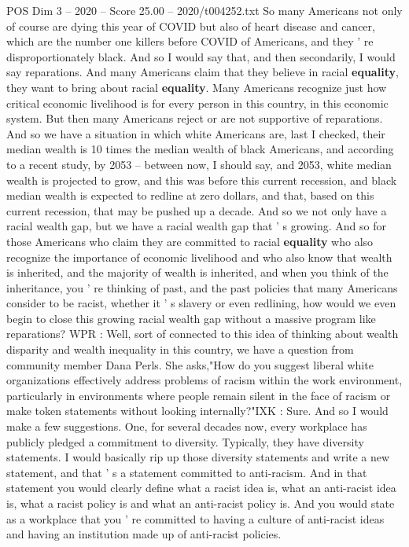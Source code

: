 \begin{textsample}{POS Dim 3 – 2020 – Score 25.00 – 2020/t004252.txt}
So many Americans not only of course are dying this year of COVID but also of heart disease and cancer, which are the number one killers before COVID of Americans, and they ' re disproportionately black.
And so I would say that, and then secondarily, I would say reparations.
And many Americans claim that they believe in racial \textbf{equality}, they want to bring about racial \textbf{equality}.
Many Americans recognize just how critical economic livelihood is for every person in this country, in this economic system.
But then many Americans reject or are not supportive of reparations.
And so we have a situation in which white Americans are, last I checked, their median wealth is 10 times the median wealth of black Americans, and according to a recent study, by 2053 -- between now, I should say, and 2053, white median wealth is projected to grow, and this was before this current recession, and black median wealth is expected to redline at zero dollars, and that, based on this current recession, that may be pushed up a decade.
And so we not only have a racial wealth gap, but we have a racial wealth gap that ' s growing.
And so for those Americans who claim they are committed to racial \textbf{equality} who also recognize the importance of economic livelihood and who also know that wealth is inherited, and the majority of wealth is inherited, and when you think of the inheritance, you ' re thinking of past, and the past policies that many Americans consider to be racist, whether it ' s slavery or even redlining, how would we even begin to close this growing racial wealth gap without a massive program like reparations?
WPR : Well, sort of connected to this idea of thinking about wealth disparity and wealth inequality in this country, we have a question from community member Dana Perls.
She asks,"How do you suggest liberal white organizations effectively address problems of racism within the work environment, particularly in environments where people remain silent in the face of racism or make token statements without looking internally?"IXK : Sure.
And so I would make a few suggestions.
One, for several decades now, every workplace has publicly pledged a commitment to diversity.
Typically, they have diversity statements.
I would basically rip up those diversity statements and write a new statement, and that ' s a statement committed to anti-racism.
And in that statement you would clearly define what a racist idea is, what an anti-racist idea is, what a racist policy is and what an anti-racist policy is.
And you would state as a workplace that you ' re committed to having a culture of anti-racist ideas and having an institution made up of anti-racist policies.

\end{textsample}
